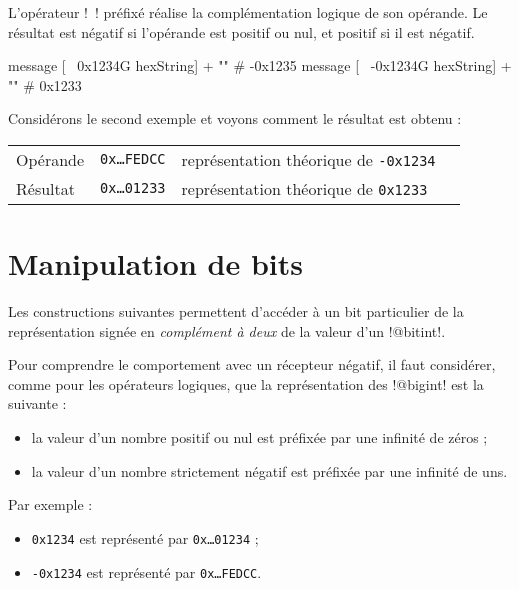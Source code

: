 L'opérateur \ggst!~! préfixé réalise la complémentation logique de son opérande. Le résultat est négatif si l'opérande est positif ou nul, et positif si il est négatif.

\begin{galgas3}
message [~  0x1234G hexString] + "\n" # -0x1235
message [~ -0x1234G hexString] + "\n" # 0x1233
\end{galgas3}

Considérons le second exemple et voyons comment le résultat est obtenu :

\begin{tabular}{llll}
Opérande & \texttt{0x…FEDCC} & représentation théorique de \texttt{-0x1234}\\
Résultat & \texttt{0x…01233} & représentation théorique de \texttt{0x1233} \\
\end{tabular}











\section{Manipulation de bits}

Les constructions suivantes permettent d'accéder à un bit particulier de la représentation signée en \emph{complément à deux} de la valeur d'un \ggst!@bitint!.

Pour comprendre le comportement avec un récepteur négatif, il faut considérer, comme pour les opérateurs logiques, que la représentation des \ggst!@bigint! est la suivante :
\begin{itemize}
  \item la valeur d'un nombre positif ou nul est préfixée par une infinité de zéros ;
  \item la valeur d'un nombre strictement négatif est préfixée par une infinité de uns.
\end{itemize}

Par exemple :
\begin{itemize}
  \item \texttt{0x1234} est représenté par \texttt{0x…01234} ;
  \item \texttt{-0x1234} est représenté par \texttt{0x…FEDCC}.
\end{itemize}


